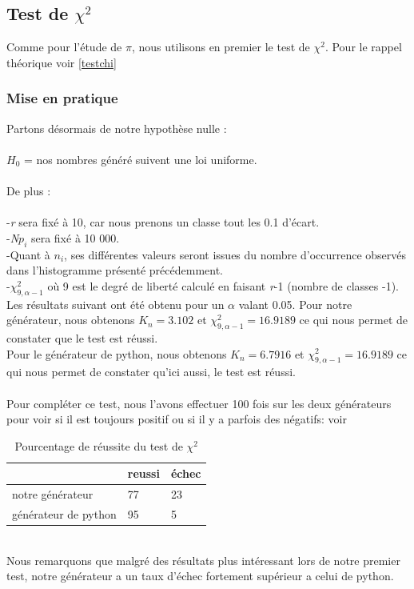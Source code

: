 \documentclass[french]{article}
\begin{document}
\subsection{Test de $\chi^{2}$}
Comme pour l'étude de $\pi$, nous utilisons en premier le test de $\chi^{2}$. Pour le rappel théorique voir \ref{testchi}
\subsubsection{Mise en pratique}
Partons désormais de notre hypothèse nulle :
\\
\\
       $H_{0}$ = {nos nombres généré suivent une loi uniforme}.
\\
\\
De plus : 
\\
\\
     -\textit{r} sera fixé à 10, car nous prenons un classe tout les 0.1 d'écart.
     \\
     -\textit{N$p_{i}$} sera fixé à 10 000.
     \\ 
     -Quant à \textit{$n_{i}$}, ses différentes valeurs seront issues du nombre d'occurrence observés dans l'histogramme présenté précédemment.
     \\
     -$\chi^{2}_{9,\alpha-1}$ où 9 est le degré de liberté calculé en faisant \textit{r}-1 (nombre de classes -1).
\\

Les résultats suivant ont été obtenu pour un $\alpha$ valant 0.05. Pour notre générateur, nous obtenons $K_n =3.102$ et $\chi^{2}_{9,\alpha-1} = 16.9189$ ce qui nous permet de constater que le test est réussi.\\
Pour le générateur de python, nous obtenons $K_n =6.7916$ et $\chi^{2}_{9,\alpha-1} = 16.9189$ ce qui nous permet de constater qu'ici aussi, le test est réussi.
\\\\
Pour compléter ce test, nous l'avons effectuer 100 fois sur les deux générateurs pour voir si il est toujours positif ou si il y a parfois des négatifs: voir 
\begin{table}[!h]
\centering
\caption{Pourcentage de réussite du test de $\chi^{2}$ }
\label{pourcentchi}
\begin{tabular}{l|l|l|}
\cline{2-3}
                                           & reussi & échec \\ \hline
\multicolumn{1}{|l|}{notre générateur}     & 77     & 23    \\ \hline
\multicolumn{1}{|l|}{générateur de python} & 95     & 5     \\ \hline
\end{tabular}
\end{table}
\\ Nous remarquons que malgré des résultats plus intéressant lors de notre premier test, notre générateur a un taux d'échec fortement supérieur a celui de python.
\end{document}
